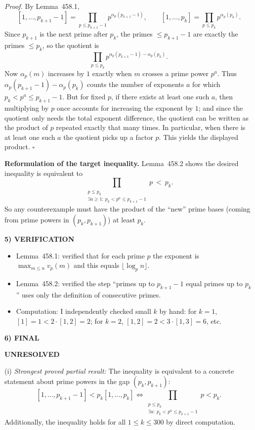 \textit{Proof.}
By Lemma~458.1,
\[[1,\dots,p_{k+1}-1]=\prod_{p\le p_{k+1}-1} p^{\alpha_p(p_{k+1}-1)},\qquad [1,\dots,p_k]=\prod_{p\le p_k} p^{\alpha_p(p_k)}.
\]
Since $p_{k+1}$ is the next prime after $p_k$, the primes $\le p_{k+1}-1$ are exactly the primes $\le p_k$, so the quotient is
\[\prod_{p\le p_k} p^{\alpha_p(p_{k+1}-1)-\alpha_p(p_k)}.
\]
Now $\alpha_p(m)$ increases by $1$ exactly when $m$ crosses a prime power $p^a$.
Thus $\alpha_p(p_{k+1}-1)-\alpha_p(p_k)$ counts the number of exponents $a$ for which $p_k < p^a\le p_{k+1}-1$.
But for fixed $p$, if there exists at least one such $a$, then multiplying by $p$ once accounts for increasing the exponent by $1$; and since the quotient only needs the total exponent difference, the quotient can be written as the product of $p$ repeated exactly that many times.  In particular, when there is at least one such $a$ the quotient picks up a factor $p$. This yields the displayed product. \hfill$\square$

\medskip
\noindent\textbf{Reformulation of the target inequality.}
Lemma~458.2 shows the desired inequality is equivalent to
\[\prod_{\substack{p\le p_k\\ \exists a\ge 1:~ p_k < p^a\le p_{k+1}-1}} p\ <\ p_k.\]
So any counterexample must have the product of the ``new'' prime bases (coming from prime powers in $(p_k,p_{k+1})$) at least $p_k$.

\medskip
\noindent\textbf{5) VERIFICATION}

\begin{itemize}
\item Lemma~458.1: verified that for each prime $p$ the exponent is $\max_{m\le n} v_p(m)$ and this equals $\lfloor\log_p n\rfloor$.
\item Lemma~458.2: verified the step ``primes up to $p_{k+1}-1$ equal primes up to $p_k$'' uses only the definition of consecutive primes.
\item Computation: I independently checked small $k$ by hand: for $k=1$, $[1]=1<2\cdot [1,2]=2$; for $k=2$, $[1,2]=2<3\cdot [1,3]=6$, etc.
\end{itemize}

\noindent\textbf{6) FINAL}

\textbf{UNRESOLVED}

(i) \emph{Strongest proved partial result:} The inequality is equivalent to a concrete statement about prime powers in the gap $(p_k,p_{k+1})$:
\[[1,\dots,p_{k+1}-1] < p_k[1,\dots,p_k]\iff \prod_{\substack{p\le p_k\\ \exists a:~ p_k<p^a\le p_{k+1}-1}} p < p_k.
\]
Additionally, the inequality holds for all $1\le k\le 300$ by direct computation.

